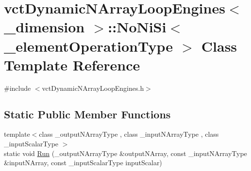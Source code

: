 \hypertarget{classvct_dynamic_n_array_loop_engines_1_1_no_ni_si}{\section{vct\-Dynamic\-N\-Array\-Loop\-Engines$<$ \-\_\-dimension $>$\-:\-:No\-Ni\-Si$<$ \-\_\-element\-Operation\-Type $>$ Class Template Reference}
\label{classvct_dynamic_n_array_loop_engines_1_1_no_ni_si}
}


{\ttfamily \#include $<$vct\-Dynamic\-N\-Array\-Loop\-Engines.\-h$>$}

\subsection*{Static Public Member Functions}
\begin{DoxyCompactItemize}
\item 
{\footnotesize template$<$class \-\_\-output\-N\-Array\-Type , class \-\_\-input\-N\-Array\-Type , class \-\_\-input\-Scalar\-Type $>$ }\\static void \hyperlink{classvct_dynamic_n_array_loop_engines_1_1_no_ni_si_af5a301f4e05e4d8e6fcd6b178628fe34}{Run} (\-\_\-output\-N\-Array\-Type \&output\-N\-Array, const \-\_\-input\-N\-Array\-Type \&input\-N\-Array, const \-\_\-input\-Scalar\-Type input\-Scalar)
\end{DoxyCompactItemize}


